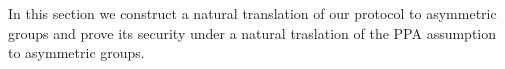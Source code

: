 In this section we construct a natural translation of our protocol to asymmetric groups and prove its security under a natural traslation of the PPA assumption to asymmetric groups.
